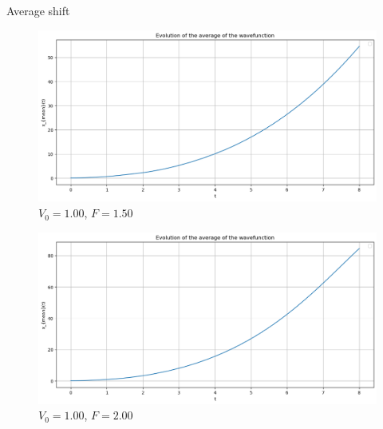\begin{frame}{Average shift}
    \begin{minipage}[c]{0.45\textwidth}
        \begin{figure}
            \centering
            \includegraphics[width=\textwidth]{Immagini/plot-moving-average-1,5.png}
            \caption*{$V_0=1.00$, $F=1.50$}
        \end{figure}
    \end{minipage}
    \hfill
    \begin{minipage}[c]{0.45\textwidth}
        \begin{figure}
            \centering
            \includegraphics[width=\textwidth]{Immagini/plot-moving-average-2.png}
            \caption*{$V_0=1.00$, $F=2.00$}
        \end{figure}
    \end{minipage}
\end{frame}

